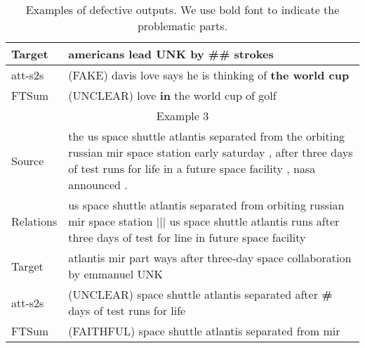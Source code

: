 \documentclass[letterpaper]{article} \usepackage{aaai18}  \usepackage{times}  \usepackage{helvet}  \usepackage{courier}  \usepackage{url}  \usepackage{graphicx}  \usepackage{amsfonts}
\begin{document}
\begin{table*}[ht]
\begin{tabularx}{\linewidth}{p{1.2cm}|X}
			\multicolumn{1}{l|}{Target}    & americans lead UNK by \#\# strokes                                                                                                                                                        \\ \hline
			\multicolumn{1}{l|}{att-s2s}   & (FAKE) davis love says he is thinking of \textbf{the world cup }                                                                                                            \\ \hline
			\multicolumn{1}{l|}{FTSum}     & (UNCLEAR) love \textbf{in} the world cup of golf                                                                                                                            \\ \hline
			\multicolumn{2}{c}{Example 3}                                                                                                                                                                                              \\ \hline
			\multicolumn{1}{l|}{Source}    & the us space shuttle atlantis separated from the orbiting russian mir space station early saturday , after three days of test runs for life in a future space facility , nasa announced . \\ \hline
			\multicolumn{1}{l|}{Relations} & us space shuttle atlantis separated from orbiting russian mir space station $|||$ us space shuttle atlantis runs after three days of test for line in future space facility               \\ \hline
			\multicolumn{1}{l|}{Target}    & atlantis mir part ways after three-day space collaboration by emmanuel UNK                                                                                                                \\ \hline
			\multicolumn{1}{l|}{att-s2s}   & (UNCLEAR) space shuttle atlantis separated after \textbf{\#} days of test runs for life                                                                                     \\ \hline
			\multicolumn{1}{l|}{FTSum}     & (FAITHFUL) space shuttle atlantis separated from mir                                                                                                                          \\ \hline
		\end{tabularx}
		\caption{Examples of defective outputs. We use bold font to indicate the problematic parts.}
		\label{tb:faithfulness_examples}
	\end{table*}
	
\end{document}
